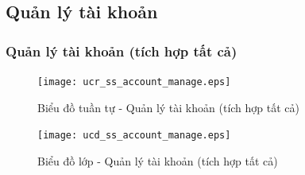 \documentclass[./../main.tex]{subfiles}
\begin{document}
\subsection{Quản lý tài khoản}
\subsubsection{Quản lý tài khoản (tích hợp tất cả)}
\begin{figure}[H]
    \centering
    \texttt{[image: ucr\_ss\_account\_manage.eps]}
    \caption{Biểu đồ tuần tự - Quản lý tài khoản (tích hợp tất cả)}
\end{figure}
\begin{figure}[H]
    \centering
    \texttt{[image: ucd\_ss\_account\_manage.eps]}
    \caption{Biểu đồ lớp - Quản lý tài khoản (tích hợp tất cả)}
\end{figure}

\end{document}

